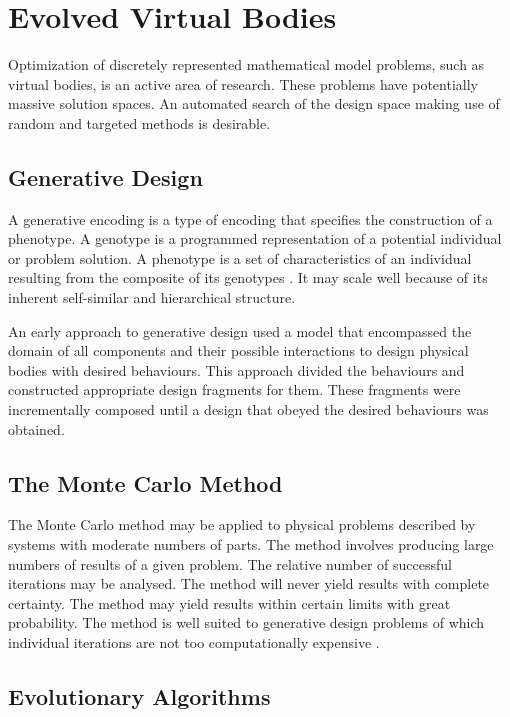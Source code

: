 \section{Evolved Virtual Bodies}

Optimization of discretely represented mathematical model problems, such as virtual bodies, is an active area of research. These problems have potentially massive solution spaces. An automated search of the design space making use of random and targeted methods is desirable.

\subsection{Generative Design}

A generative encoding is a type of encoding that specifies the construction of a phenotype. A genotype is a programmed representation of a potential individual or problem solution. A phenotype is a set of characteristics of an individual resulting from the composite of its genotypes \citep{Sims1994a}. It may scale well because of its inherent self-similar and hierarchical structure. \citep{Hornby2001b}

An early approach to generative design used a model that encompassed the domain of all components and their possible interactions to design physical bodies with desired behaviours. This approach divided the behaviours and constructed appropriate design fragments for them. These fragments were incrementally composed until a design that obeyed the desired behaviours was obtained. \citep{Brose1993} 

\subsection{The Monte Carlo Method}

The Monte Carlo method may be applied to physical problems described by systems with moderate numbers of parts. The method involves producing large numbers of results of a given problem. The relative number of successful iterations may be analysed. The method will never yield results with complete certainty. The method may yield results within certain limits with great probability. The method is well suited to generative design problems of which individual iterations are not too computationally expensive \citep{Metropolis1949}.

\subsection{Evolutionary Algorithms}

